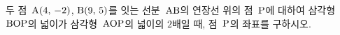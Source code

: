 두 점~$\mathrm{A}(4,\,-2)$, $\mathrm{B}(9,\,5)$를 잇는 선분~$\mathrm{AB}$의 연장선 위의 점~$\mathrm{P}$에 대하여 삼각형~$\mathrm{BOP}$의 넓이가 삼각형~$\mathrm{AOP}$의 넓이의 $2$배일 때, 점~$\mathrm{P}$의 좌표를 구하시오. 
